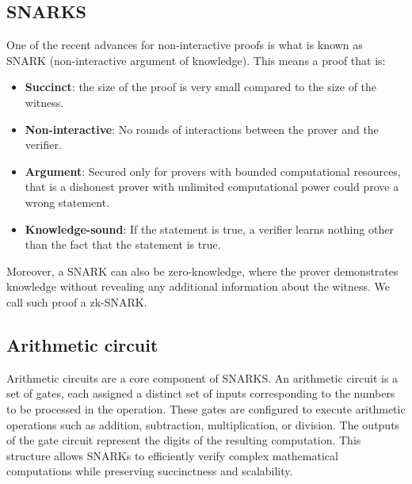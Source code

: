 \subsection{SNARKS}
One of the recent advances for non-interactive proofs is what is known as SNARK (non-interactive argument of knowledge).
This means a proof that is:
\begin{itemize}


   \item \textbf{Succinct}: the size of the proof is very small compared to the size of the witness.
  
   \item \textbf{Non-interactive}: No rounds of interactions between the prover and the verifier.


   \item \textbf{Argument}: Secured only for provers with bounded computational resources, that is a dishonest prover with unlimited computational power could prove a wrong statement.


   \item \textbf{Knowledge-sound}: If the statement is true,  a verifier learns nothing other than the fact that the statement is true. \cite{NZ20}
  
   \end{itemize}


Moreover, a SNARK can also be zero-knowledge, where the prover demonstrates knowledge without revealing any additional information about the witness. We call such proof a zk-SNARK.


\subsection{Arithmetic circuit}
\label{subsec:ac}




Arithmetic circuits are a core component of SNARKS. An arithmetic circuit is a set of gates, each assigned a distinct set of inputs corresponding to the numbers to be processed in the operation.
These gates are configured to execute arithmetic operations such as addition, subtraction, multiplication, or division. The outputs of the gate circuit represent the digits of the resulting computation.
This structure allows SNARKs to efficiently verify complex mathematical computations while preserving succinctness and scalability.



